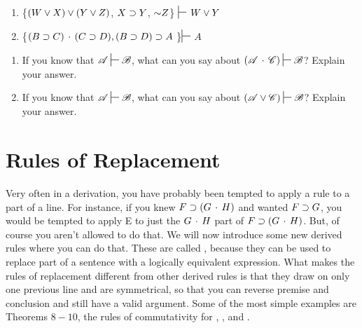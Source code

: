 {\begin{enumerate}[label=(\arabic*)]
\item \{$(W \vee X) \vee (Y \vee Z)$, $X\supset Y$, $\mathord{\sim} Z$\} $\sststile{}{}$ $W\vee Y$
\item \{$(B \supset C) \,\cdot\, (C \supset D), (B \supset D) \supset A $ \}$ \sststile{}{}$ $A$



\end{enumerate}

\noindent\problempart
\begin{enumerate}[label=(\arabic*)]

\item If you know that $\script{A}\sststile{}{}\script{B}$, what can you say about $(\script{A}\eand\script{C})\sststile{}{}\script{B}$? Explain your answer.



\item If you know that $\script{A}\sststile{}{}\script{B}$, what can you say about $(\script{A}\eor\script{C})\sststile{}{}\script{B}$? Explain your answer.
\end{enumerate}





\section{Rules of Replacement}
\label{sec:rules_of_rep}
\setlength{\parindent}{1em}



Very often in a derivation, you have probably been tempted to apply a rule to a part of a line. For instance, if you knew $F\supset(G\,\cdot\, H)$ and wanted $F\supset G$, you would be tempted to apply \eand E to just the $G \,\cdot\, H$ part of $F \supset (G \,\cdot\, H)$. But, of course you aren't allowed to do that. We will now introduce some new derived rules where you can do that. These are called , because they can be used to replace part of a sentence with a logically equivalent expression. What makes the rules of replacement different from other derived rules is that they draw on only one previous line and are symmetrical, so that you can reverse premise and conclusion and still have a valid argument. Some of the most simple examples are Theorems $8-10$, the rules of commutativity for \eand, \eor, and \eiff. 

}
